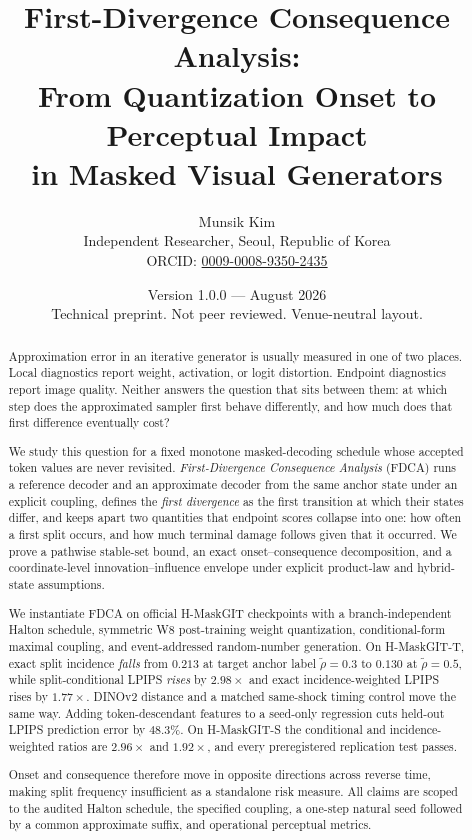 \documentclass[11pt,a4paper]{article}
\title{\bfseries First-Divergence Consequence Analysis:\\
From Quantization Onset to Perceptual Impact\\
in Masked Visual Generators}
\author{Munsik Kim\\
\small Independent Researcher, Seoul, Republic of Korea\\
\small ORCID: \href{https://orcid.org/0009-0008-9350-2435}{0009-0008-9350-2435}}
\date{Version 1.0.0 --- August 2026\\[2pt]
\small Technical preprint. Not peer reviewed. Venue-neutral layout.}
\theoremstyle{plain}
\theoremstyle{definition}
\theoremstyle{remark}
\newcommand{\rholabel}{\widetilde{\rho}}
\begin{document}
\maketitle
\thispagestyle{fancy}

\begin{abstract}
\noindent
Approximation error in an iterative generator is usually measured in one of two
places. Local diagnostics report weight, activation, or logit distortion.
Endpoint diagnostics report image quality. Neither answers the question that sits
between them: at which step does the approximated sampler first behave
differently, and how much does that first difference eventually cost?

We study this question for a fixed monotone masked-decoding schedule whose
accepted token values are never revisited. \emph{First-Divergence Consequence
Analysis} (FDCA) runs a reference decoder and an approximate decoder from the
same anchor state under an explicit coupling, defines the \emph{first divergence}
as the first transition at which their states differ, and keeps apart two
quantities that endpoint scores collapse into one: how often a first split
occurs, and how much terminal damage follows given that it occurred. We prove a
pathwise stable-set bound, an exact onset--consequence decomposition, and a
coordinate-level innovation--influence envelope under explicit product-law and
hybrid-state assumptions.

We instantiate FDCA on official H-MaskGIT checkpoints with a branch-independent
Halton schedule, symmetric W8 post-training weight quantization,
conditional-form maximal coupling, and event-addressed random-number generation.
On H-MaskGIT-T, exact split incidence \emph{falls} from $0.213$ at target anchor label
$\rholabel=0.3$ to $0.130$ at $\rholabel=0.5$, while split-conditional LPIPS
\emph{rises} by $2.98\times$ and exact incidence-weighted LPIPS rises by
$1.77\times$. DINOv2 distance and a matched same-shock timing control move the
same way. Adding token-descendant features to a seed-only regression cuts
held-out LPIPS prediction error by $48.3\%$. On H-MaskGIT-S the conditional and
incidence-weighted ratios are $2.96\times$ and $1.92\times$, and every
preregistered replication test passes.

Onset and consequence therefore move in opposite directions across reverse
time, making split frequency insufficient as a standalone risk measure. All
claims are scoped to the audited Halton schedule, the specified coupling, a
one-step natural seed followed by a common approximate suffix, and operational
perceptual metrics.
\end{abstract}
\end{document}
